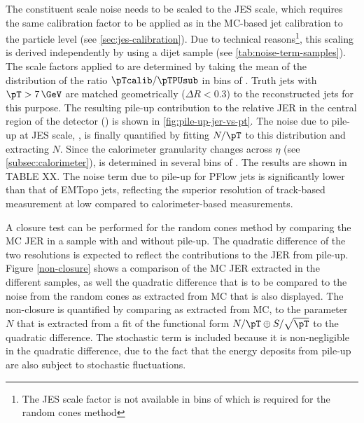 
The constituent scale noise needs to be scaled to the JES scale, which requires the same calibration factor to be applied as in the MC-based jet calibration to the particle level (see \cref{sec:jes-calibration}).
Due to technical reasons\footnote{The JES scale factor is not available in bins of \pTtruth which is required for the random cones method}, this scaling is derived independently by using a dijet sample (see \cref{tab:noise-term-samples}). The scale factors applied to \Npileupconstscale are determined by taking the mean of the distribution of the ratio $\pTcalib / \pTPUsub$ in bins of \pTtruth. Truth jets with $\pT > 7\,\GeV$ are matched geometrically ($\Delta R < 0.3$) to the reconstructed jets for this purpose.
The resulting pile-up contribution to the relative JER in the central region of the detector () is shown in \cref{fig:pile-up-jer-vs-pt}.
The noise due to pile-up at JES scale, \Npileup, is finally quantified by fitting $N/\pT$ to this distribution and extracting $N$.
Since the calorimeter granularity changes across $\eta$ (see \cref{subsec:calorimeter}), \Npileup is determined in several bins of \absetadet. The results are shown in TABLE XX.
The noise term due to pile-up for PFlow jets is significantly lower than that of EMTopo jets, reflecting the superior resolution of track-based measurement at low \pT compared to calorimeter-based measurements.

A closure test can be performed for the random cones method by comparing the MC JER in a sample with and without pile-up. The quadratic difference of the two resolutions is expected to reflect the contributions to the JER from pile-up. Figure \cref{non-closure} shows a comparison of the MC JER extracted in the different samples, as well the quadratic difference that is to be compared to the noise from the random cones as extracted from MC that is also displayed. The non-closure is quantified by comparing \Npileup as extracted from MC, to the parameter $N$ that is extracted from a fit of the functional form $N/\pT \oplus S/\sqrt{\pT}$ to the quadratic difference. The stochastic term is included because it is non-negligible in the quadratic difference, due to the fact that the energy deposits from pile-up are also subject to stochastic fluctuations.

